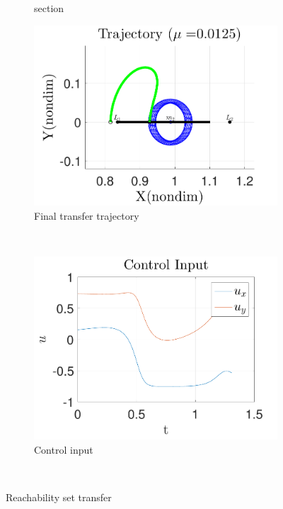 \documentclass[preprint]{elsarticle}
\begin{document}
\begin{figure}
\begin{subfigure}[htbp]{0.5\textwidth}
		\caption{\Poincare section} \label{fig:poincare_compare} 
	\end{subfigure} %
		
	\begin{subfigure}[htbp]{0.5\textwidth} 
		\includegraphics[width=\textwidth]{reach_transfer} 
		\caption{Final transfer trajectory} \label{fig:reach_transfer} 
	\end{subfigure}~ 
	\begin{subfigure}[htbp]{0.5\textwidth} 
		\includegraphics[width=\textwidth]{control_input_l1} 
		\caption{Control input} \label{fig:control_l1} 
	\end{subfigure}~
	\caption{Reachability set transfer}
	\label{fig:reachability_set_transfer} 
\end{figure}
\end{document}
